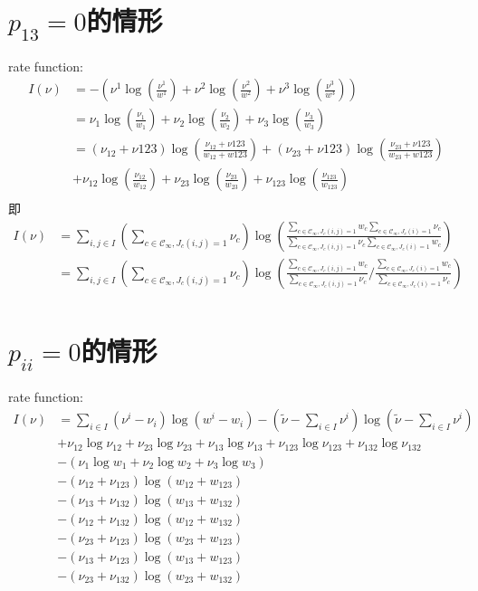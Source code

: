 \documentclass[cn,hazy,egreen,14pt,normal]{elegantnote}
\begin{document}
\section{$p_{13}=0$的情形}
rate function:
\begin{align*}
    I(\nu)
    &= -(\nu^{1} \log (\frac{\nu^{1}}{w^{1}}) + \nu^{2} \log (\frac{\nu^{2}}{w^{2}}) + \nu^{3} \log (\frac{\nu^{3}}{w^{3}})) \\
    &= \nu_{1} \log (\frac{\nu_{1}}{w_{1}}) + \nu_{2} \log (\frac{\nu_{2}}{w_{2}}) + \nu_{3} \log (\frac{\nu_{3}}{w_{3}}) \\
    &= (\nu_{12}+\nu{123}) \log(\frac{\nu_{12}+\nu{123}}{w_{12}+w{123}}) +
    (\nu_{23}+\nu{123}) \log(\frac{\nu_{23}+\nu{123}}{w_{23}+w{123}}) \\
    &+ \nu_{12} \log(\frac{\nu_{12}}{w_{12}}) + \nu_{23} \log(\frac{\nu_{23}}{w_{23}}) + \nu_{123} \log(\frac{\nu_{123}}{w_{123}}) \\
\end{align*}
即
\begin{align*}
    I(\nu) &=  \sum_{i, j \in I} \left(\sum_{c \in \mathcal{C_{\infty}}, J_c(i, j)=1}
    \nu_c \right) \log(\frac{\sum_{c \in \mathcal{C_{\infty}}, J_c(i, j)=1} w_c \sum_{c \in \mathcal{C_{\infty}}, J_c(i)=1} \nu_c}{\sum_{c \in \mathcal{C_{\infty}}, J_c(i, j)=1} \nu_c \sum_{c \in \mathcal{C_{\infty}}, J_c(i)=1} w_c}) \\
    &= \sum_{i, j \in I} \left(\sum_{c \in \mathcal{C_{\infty}}, J_c(i, j)=1}
    \nu_c \right) \log(\frac{\sum_{c \in \mathcal{C_{\infty}}, J_c(i, j)=1} w_c }{\sum_{c \in \mathcal{C_{\infty}}, J_c(i, j)=1} \nu_c }
    /\frac{\sum_{c \in \mathcal{C_{\infty}}, J_c(i)=1} w_c}{\sum_{c \in \mathcal{C_{\infty}}, J_c(i)=1} \nu_c}) \\
\end{align*}

\section{$p_{ii}=0$的情形}
rate function:
\begin{align*}
    I(\nu)
    &= \sum_{i \in I} (\nu^{i}-\nu_{i}) \log (w^{i}-w_{i})
    - (\tilde{\nu} - \sum_{i \in I} \nu^{i}) \log (\tilde{\nu} - \sum_{i \in I} \nu^{i}) \\
    &+ \nu_{12} \log \nu_{12} + \nu_{23} \log \nu_{23} + \nu_{13} \log \nu_{13} +\nu_{123} \log \nu_{123} + \nu_{132} \log \nu_{132} \\
    &- (\nu_{1} \log w_{1} + \nu_{2} \log w_{2} + \nu_{3} \log w_{3})\\
    &- (\nu_{12} + \nu_{123}) \log(w_{12} + w_{123}) \\
    &- (\nu_{13} + \nu_{132}) \log(w_{13} + w_{132}) \\
    &- (\nu_{12} + \nu_{132}) \log(w_{12} + w_{132}) \\
    &- (\nu_{23} + \nu_{123}) \log(w_{23} + w_{123}) \\
    &- (\nu_{13} + \nu_{123}) \log(w_{13} + w_{123}) \\
    &- (\nu_{23} + \nu_{132}) \log(w_{23} + w_{132})
\end{align*}
\end{document}

